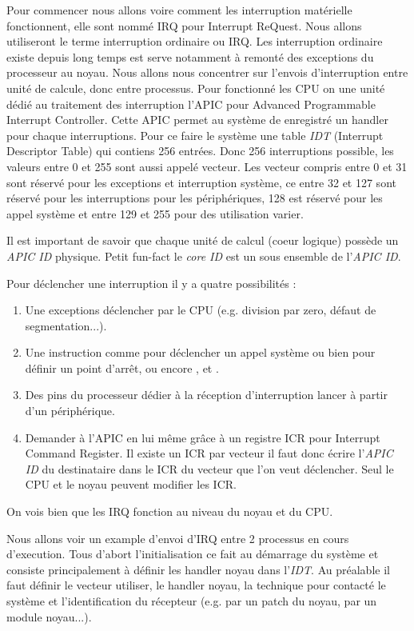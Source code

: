 Pour commencer nous allons voire comment les interruption matérielle fonctionnent, elle sont nommé IRQ pour Interrupt ReQuest.
Nous allons utiliseront le terme interruption ordinaire ou IRQ.
Les interruption ordinaire existe depuis long temps est serve notamment à remonté des exceptions du processeur au noyau.
Nous allons nous concentrer sur l'envois d'interruption entre unité de calcule, donc entre processus.
Pour fonctionné les CPU on une unité dédié au traitement des interruption l'APIC pour Advanced Programmable Interrupt Controller.
Cette APIC permet au système de enregistré un handler pour chaque interruptions.
Pour ce faire le système une table \emph{IDT} (Interrupt Descriptor Table) qui contiens 256 entrées.
Donc 256 interruptions possible, les valeurs entre 0 et 255 sont aussi appelé vecteur.
Les vecteur compris entre 0 et 31 sont réservé pour les exceptions et interruption système, ce entre 32 et 127 sont réservé pour les interruptions pour les périphériques,
128 est réservé pour les appel système et entre 129 et 255 pour des utilisation varier.

Il est important de savoir que chaque unité de calcul (coeur logique) possède un \emph{APIC ID} physique.
Petit fun-fact le \emph{core ID} est un sous ensemble de l'\emph{APIC ID}.

Pour déclencher une interruption il y a quatre possibilités :

\begin{enumerate}
  \item Une exceptions déclencher par le CPU (e.g. division par zero, défaut de segmentation...).
  \item Une instruction comme  pour déclencher un appel système ou bien  pour définir un point d'arrêt, ou encore ,  et .
  \item Des pins du processeur dédier à la réception d'interruption lancer à partir d'un périphérique.
  \item Demander à l'APIC en lui même grâce à un registre ICR pour Interrupt Command Register.
  Il existe un ICR par vecteur il faut donc écrire l'\emph{APIC ID} du destinataire dans le ICR du vecteur que l'on veut déclencher.
  Seul le CPU et le noyau peuvent modifier les ICR.
\end{enumerate}

On vois bien que les IRQ fonction au niveau du noyau et du CPU.

Nous allons voir un example d'envoi d'IRQ entre 2 processus en cours d'execution.
Tous d'abort l'initialisation ce fait au démarrage du système et consiste principalement à définir les handler noyau dans l'\emph{IDT}.
Au préalable il faut définir le vecteur utiliser, le handler noyau, la technique pour contacté le système et l'identification du récepteur (e.g. par un patch du noyau, par un module noyau...).

